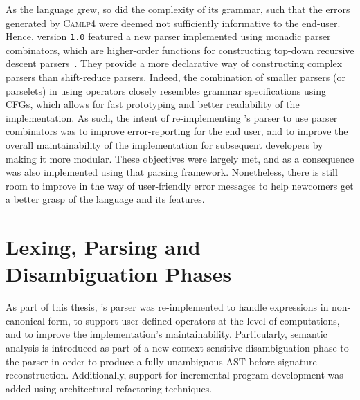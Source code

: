 As the \Beluga language grew, so did the complexity of its grammar, such that the errors generated by \textsc{Camlp4} were deemed not sufficiently informative to the end-user.
Hence, \Beluga version \texttt{1.0} featured a new parser implemented using monadic parser combinators, which are higher-order functions for constructing top-down recursive descent parsers~\cite{Burge1975-BURRPT, hutton1996monadic, leijen2001parsec, generalparsercombs}.
They provide a more declarative way of constructing complex parsers than shift-reduce parsers.
Indeed, the combination of smaller parsers (or parselets) in \OCaml using operators closely resembles grammar specifications using \acp{CFG}, which allows for fast prototyping and better readability of the implementation.
As such, the intent of re-implementing \Beluga's parser to use parser combinators was to improve error-reporting for the end user, and to improve the overall maintainability of the implementation for subsequent developers by making it more modular.
These objectives were largely met, and as a consequence \Harpoon was also implemented using that parsing framework.
Nonetheless, there is still room to improve in the way of user-friendly error messages to help newcomers get a better grasp of the language and its features.

\section{\Beluga Lexing, Parsing and Disambiguation Phases}\label{section:lexing-parsing-disambiguation}

As part of this thesis, \Beluga's parser was re-implemented to handle expressions in non-canonical form, to support user-defined operators at the level of computations, and to improve the implementation's maintainability.
Particularly, semantic analysis is introduced as part of a new context-sensitive disambiguation phase to the parser in order to produce a fully unambiguous \ac{AST} before signature reconstruction.
Additionally, support for incremental program development was added using architectural refactoring techniques.


